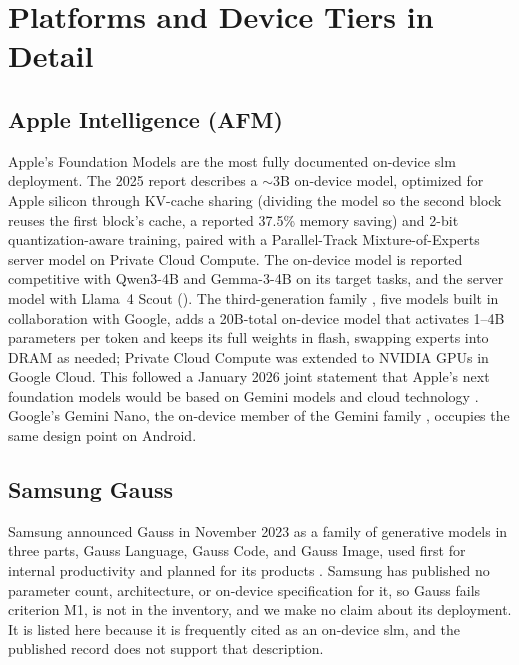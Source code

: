 
\section{Platforms and Device Tiers in Detail}
\label{supp:deployment}

\subsection{Apple Intelligence (AFM)}

Apple's Foundation Models \citep{apple2024intelligence,gunter2025afm} are the most fully documented on-device \gls{slm} deployment. The 2025 report \citep{gunter2025afm} describes a $\sim$3B on-device model, optimized for Apple silicon through KV-cache sharing (dividing the model so the second block reuses the first block's cache, a reported 37.5\% memory saving) and 2-bit quantization-aware training, paired with a Parallel-Track Mixture-of-Experts server model on Private Cloud Compute. The on-device model is reported competitive with Qwen3-4B and Gemma-3-4B on its target tasks, and the server model with Llama~4 Scout (\evC). The third-generation family \citep{apple2026afm3}, five models built in collaboration with Google, adds a 20B-total on-device model that activates 1--4B parameters per token and keeps its full weights in flash, swapping experts into DRAM as needed; Private Cloud Compute was extended to NVIDIA GPUs in Google Cloud. This followed a January 2026 joint statement that Apple's next foundation models would be based on Gemini models and cloud technology \citep{google_apple2026statement}. Google's Gemini Nano, the on-device member of the Gemini family \citep{gemini2023}, occupies the same design point on Android.

\subsection{Samsung Gauss}

Samsung announced Gauss in November 2023 as a family of generative models in three parts, Gauss Language, Gauss Code, and Gauss Image, used first for internal productivity and planned for its products \citep{samsung2023gauss}. Samsung has published no parameter count, architecture, or on-device specification for it, so Gauss fails criterion M1, is not in the inventory, and we make no claim about its deployment. It is listed here because it is frequently cited as an on-device \gls{slm}, and the published record does not support that description.

